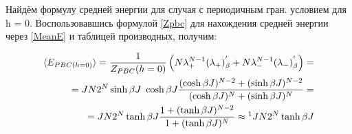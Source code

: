 Найдём формулу средней энергии для случая с периодичным гран. условием для h = 0. Воспользовавшись формулой \eqref{Zpbc} для нахождения средней энергии через \eqref{MeanE} и таблицей производных, получим:

\begin{align*}
    \la E_{PBC (h = 0)} \ra = \frac{1}{Z\pbc(h = 0)}\left(N\lp^{N-1}(\lp)\prpb + N\lm^{N-1}(\lm)\prpb \right) = \\
    = JN2^{N}\sinh{\bj}\ \cosh{\bj} \frac{(\cosh{\bj})^{N-2} + (\sinh{\bj})^{N-2}}{(\cosh{\bj})^{N} + (\sinh{\bj})^{N}} = \\
    = JN2^{N} \tanh{\bj} \frac{1 + (\tanh{\bj})^{N-2}}{1 + (\tanh{\bj})^{N}} \approx \footnotemark JN2^{N} \tanh{\bj}
\end{align*}

